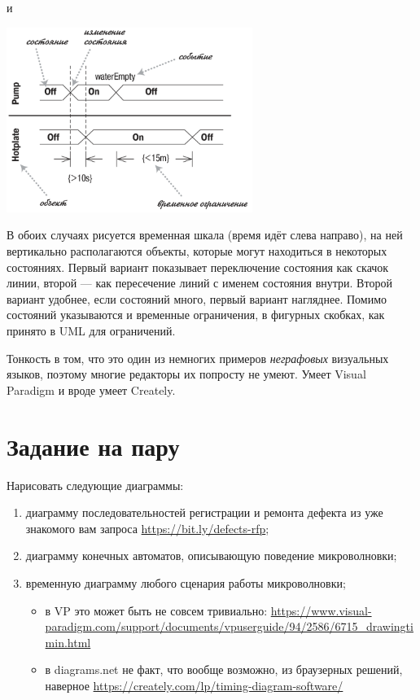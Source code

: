 \documentclass{../mcstext}
\begin{document}
и

\begin{center}
    \includegraphics[width=0.6\textwidth]{timingDiagramsAlternate.png}
\end{center}

В обоих случаях рисуется временная шкала (время идёт слева направо), на ней вертикально располагаются объекты, которые могут находиться в некоторых состояниях. Первый вариант показывает переключение состояния как скачок линии, второй --- как пересечение линий с именем состояния внутри. Второй вариант удобнее, если состояний много, первый вариант нагляднее. Помимо состояний указываются и временные ограничения, в фигурных скобках, как принято в UML для ограничений.

Тонкость в том, что это один из немногих примеров \emph{неграфовых} визуальных языков, поэтому многие редакторы их попросту не умеют. Умеет Visual Paradigm и вроде умеет Creately.

\section{Задание на пару}

Нарисовать следующие диаграммы:

\begin{enumerate}
    \item диаграмму последовательностей регистрации и ремонта дефекта из уже знакомого вам запроса \url{https://bit.ly/defects-rfp};
    \item диаграмму конечных автоматов, описывающую поведение микроволновки;
    \item временную диаграмму любого сценария работы микроволновки;
    \begin{itemize}
        \item в VP это может быть не совсем тривиально: \url{https://www.visual-paradigm.com/support/documents/vpuserguide/94/2586/6715_drawingtimin.html}
        \item в diagrams.net не факт, что вообще возможно, из браузерных решений, наверное \url{https://creately.com/lp/timing-diagram-software/}
    \end{itemize}
\end{enumerate}
\end{document}
